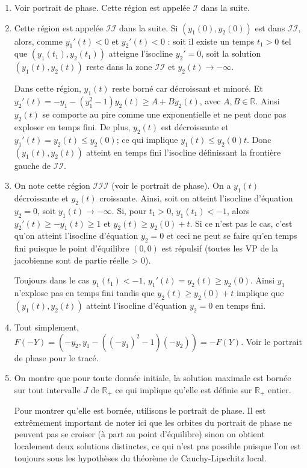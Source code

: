 \documentclass[11pt,a4paper]{article}
\newcommand{\R}{\mathbb R}
\begin{document}
\begin{enumerate}
\item Voir portrait de phase. Cette r\'egion est appel\'ee $\mathcal{I}$ dans la suite.

\item Cette r\'egion est appel\'ee $\mathcal{II}$ dans la suite.
  Si $(y_1(0),y_2(0))$ est dans $\mathcal{II}$, alors, comme $y_1'(t) < 0$ et $y_2'(t) < 0$ :
  soit il existe un temps $t_1 > 0$ tel que $(y_1(t_1) , y_2(t_1))$ atteigne
  l'isocline $y_2' = 0$, soit la solution $(y_1(t),y_2(t))$ reste dans la zone $\mathcal{II}$
  et $y_2(t) \to - \infty$.

  
  Dans cette r\'egion, $y_1(t)$ reste born\'e car d\'ecroissant et minor\'e.
  Et $y_2'(t) = -y_1 - (y_1^2 - 1) y_2(t) \geq A + B y_2(t)$, avec $A,B \in \R$.
  Ainsi $y_2(t)$ se comporte au pire comme une exponentielle et ne peut donc pas exploser en temps
  fini.
  De plus, $y_2(t)$ est d\'ecroissante et $y_1'(t) = y_2(t) \leq y_2(0)$;
  ce qui implique $y_1(t) \leq y_2(0) t$.
  Donc $(y_1(t),y_2(t))$ atteint en temps fini l'isocline d\'efinissant la fronti\`ere gauche de
  $\mathcal{II}$.


\item On note cette r\'egion $\mathcal{III}$ (voir le portrait de phase).
  On a $y_1(t)$ d\'ecroissante et $y_2(t)$ croissante.
  Ainsi, soit on atteint l'isocline d'\'equation $y_2 = 0$, soit $y_1(t) \to - \infty$.
  Si, pour $t_1 > 0$, $y_1(t_1) < -1$, alors $y_2'(t) \geq - y_1(t) \geq 1$
  et $y_2(t) \geq y_2(0) + t$.
  Si ce n'est pas le cas, c'est qu'on atteint l'isocline d'\'equation $y_2 = 0$
  et ceci ne peut se faire qu'en temps fini puisque le point d'\'equilibre $(0,0)$ est r\'epulsif
  (toutes les VP de la jacobienne sont de partie r\'eelle > 0).

  Toujours dans le cas $y_1(t_1) < -1$, $y_1'(t) = y_2(t) \geq y_2(0)$.
  Ainsi $y_1$ n'explose pas en temps fini tandis que $y_2(t) \geq y_2(0) + t$
  implique que $(y_1(t),y_2(t))$ atteint l'isocline d'\'equation $y_2=0$ en temps fini.
  
\item Tout simplement,
  $F(-Y) = (- y_2 , y_1 - ((-y_1)^2 -1)(-y_2)) = - F(Y)$.
  Voir le portrait de phase pour le trac\'e.

\item On montre que pour toute donn\'ee initiale, la solution maximale
  est born\'ee sur tout intervalle $J$ de $\R_+$
  ce qui implique qu'elle est d\'efinie sur $\R_+$ entier.

  Pour montrer qu'elle est born\'ee, utilisons le portrait de phase.
  Il est extr\^emement important de noter ici que les orbites du portrait de phase
  ne peuvent pas se croiser (\`a part au point d'\'equilibre) sinon on obtient localement
  deux solutions distinctes, ce qui n'est pas possible
  puisque l'on est toujours sous les hypoth\`eses du th\'eor\`eme de Cauchy-Lipschitz local.


\end{enumerate}
\end{document}
